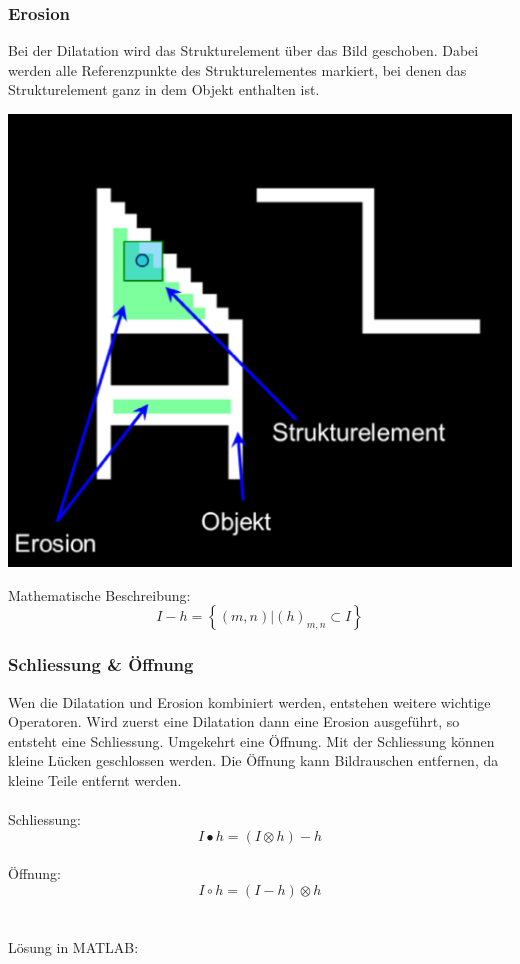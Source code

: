 \subsubsection{Erosion}
Bei der Dilatation wird das Strukturelement über das Bild geschoben.
Dabei werden alle Referenzpunkte des Strukturelementes markiert, bei denen das Strukturelement ganz in dem Objekt enthalten ist.
\begin{center}
	\includegraphics[scale=0.5]{./images/erosion.png}
\end{center}
Mathematische Beschreibung:
\[
	I - h = \left\lbrace (m,n) | (h)_{m,n} \subset I \right\rbrace
\]

\subsubsection{Schliessung \& Öffnung}
Wen die Dilatation und Erosion kombiniert werden, entstehen weitere wichtige Operatoren.
Wird zuerst eine Dilatation dann eine Erosion ausgeführt, so entsteht eine Schliessung.
Umgekehrt eine Öffnung.
Mit der Schliessung können kleine Lücken geschlossen werden.
Die Öffnung kann Bildrauschen entfernen, da kleine Teile entfernt werden.\\
\\
Schliessung:
\[
	I \bullet h = (I \otimes h) - h
\]
~\\
Öffnung:
\[
	I \circ h = (I - h) \otimes h
\]
~\\\\
Lösung in MATLAB:
\lstset{language=Matlab}

~\\

